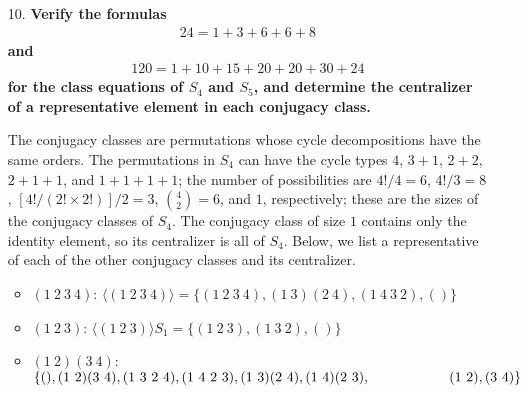 \documentclass[a4paper,12pt]{article}
\begin{document}
\begin{enumerate}
    \item[10.]
        \boldmath
        \textbf{Verify the formulas
        \begin{gather*}
            24 = 1 + 3 + 6 + 6 + 8
        \end{gather*}
        and
        \begin{gather*}
            120 = 1 + 10 + 15 + 20 + 20 + 30 + 24
        \end{gather*}
        for the class equations of $S_4$ and $S_5$, and determine the centralizer of a representative element in each conjugacy class.} \par
        \unboldmath
        The conjugacy classes are permutations whose cycle decompositions have the same orders. The permutations in $S_4$ can have the cycle types $4$, $3 + 1$, $2 + 2$, $2 + 1 + 1$, and $1 + 1 + 1 + 1$; the number of possibilities are $4!/4 = 6$, $4!/3 = 8$, $[4!/(2! \times 2!)]/2 = 3$, $\binom{4}{2} = 6$, and $1$, respectively; these are the sizes of the conjugacy classes of $S_4$. The conjugacy class of size $1$ contains only the identity element, so its centralizer is all of $S_4$. Below, we list a representative of each of the other conjugacy classes and its centralizer.
        \begin{itemize}
            \item
                $(1\ 2\ 3\ 4)$: $\langle (1\ 2\ 3\ 4) \rangle = \{ (1\ 2\ 3\ 4), (1\ 3)(2\ 4), (1\ 4\ 3\ 2), () \}$
                
            \item
                $(1\ 2\ 3)$: $\langle (1\ 2\ 3) \rangle S_1 = \{ (1\ 2\ 3), (1\ 3\ 2), () \}$
                
            \item
                $(1\ 2)(3\ 4)$: $\{ (), (1\ 2)(3\ 4), (1\ 3\ 2\ 4), (1\ 4\ 2\ 3), (1\ 3)(2\ 4), (1\ 4)(2\ 3), \\
                ~~~~~~~~~~~~~~~~~(1\ 2), (3\ 4) \}$
                

\end{itemize}
\end{enumerate}
\end{document}
